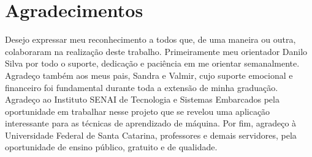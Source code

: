 \thispagestyle{plain}

\section*{Agradecimentos}

\noindent Desejo expressar meu reconhecimento a todos que, de uma maneira ou outra, colaboraram na realização deste trabalho. Primeiramente meu orientador Danilo Silva por todo o suporte, dedicação e paciência em me orientar semanalmente. Agradeço também aos meus pais, Sandra e Valmir, cujo suporte emocional e financeiro foi fundamental durante toda a extensão de minha graduação. Agradeço ao Instituto SENAI de Tecnologia e Sistemas Embarcados pela oportunidade em trabalhar nesse projeto que se revelou uma aplicação interessante para as técnicas de aprendizado de máquina. Por fim, agradeço à Universidade Federal de Santa Catarina, professores e demais servidores, pela oportunidade de ensino público, gratuito e de qualidade.

\cleardoublepageempty
